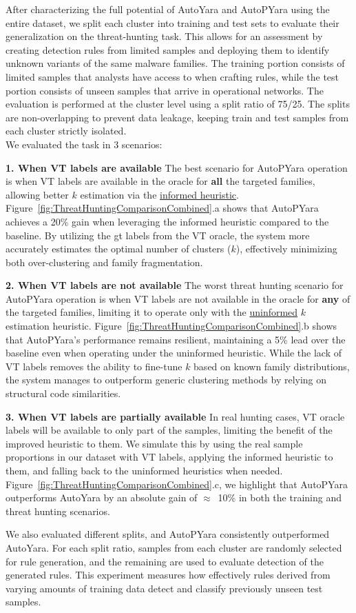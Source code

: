\noindent After characterizing the full potential of AutoYara and AutoPYara using the entire dataset, we split each cluster into training and test sets to evaluate their generalization on the threat-hunting task. This allows for an assessment by creating detection rules from limited samples and deploying them to identify unknown variants of the same malware families. The training portion consists of limited samples that analysts have access to when crafting rules, while the test portion consists of unseen samples that arrive in operational networks. The evaluation is performed at the cluster level using a split ratio of 75/25. The splits are non-overlapping to prevent data leakage, keeping train and test samples from each cluster strictly isolated. \\
We evaluated the task in 3 scenarios:

\noindent\textbf{1. When VT labels are available} 
The best scenario for AutoPYara operation is when VT labels are available in the oracle for \textbf{all} the targeted families, allowing better $k$ estimation via the \uline{informed heuristic}. Figure~\ref{fig:ThreatHuntingComparisonCombined}.a shows that AutoPYara achieves a 20\% gain when leveraging the informed heuristic compared to the baseline. By utilizing the gt labels from the VT oracle, the system more accurately estimates the optimal number of clusters ($k$), effectively minimizing both over-clustering and family fragmentation.

\noindent\textbf{2. When VT labels are not available}
The worst threat hunting scenario for AutoPYara operation is when VT labels are not available in the oracle for \textbf{any} of the targeted families, limiting it to operate only with the \uline{uninformed} $k$ estimation heuristic. Figure~\ref{fig:ThreatHuntingComparisonCombined}.b shows that AutoPYara's performance remains resilient, maintaining a 5\% lead over the baseline even when operating under the uninformed heuristic. While the lack of VT labels removes the ability to fine-tune $k$ based on known family distributions, the system manages to outperform generic clustering methods by relying on structural code similarities.

\noindent\textbf{3. When VT labels are partially available} In real hunting cases, VT oracle labels will be available to only part of the samples, limiting the benefit of the improved heuristic to them. We simulate this by using the real sample proportions in our dataset with VT labels, applying the informed heuristic to them, and falling back to the uninformed heuristics when needed. Figure~\ref{fig:ThreatHuntingComparisonCombined}.c, we highlight that AutoPYara outperforms AutoYara by an absolute gain of $\approx$~10\% in both the training and threat hunting scenarios.

 We also evaluated different splits, and AutoPYara consistently outperformed AutoYara. For each split ratio, samples from each cluster are randomly selected for rule generation, and the remaining are used to evaluate detection of the generated rules. This experiment measures how effectively rules derived from varying amounts of training data detect and classify previously unseen test samples.
